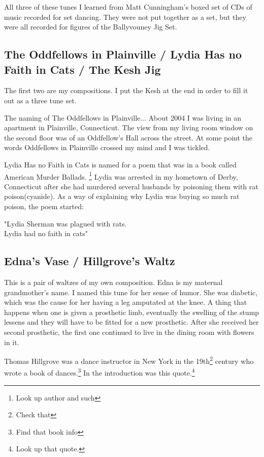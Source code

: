 \documentclass[11pt,letterpaper]{article}
\begin{document}
All three of these tunes I learned from Matt Cunningham's boxed set of CDs of music recorded for set dancing. They were not put together as a set, but they were all recorded for figures of the Ballyvouney Jig Set. 

\subsection*{The Oddfellows in Plainville / Lydia Has no Faith in Cats / The Kesh Jig}

The first two are my compositions. I put the Kesh at the end in order to fill it out as a three tune set.

The naming of The Oddfellows in Plainville... About 2004 I was living in an apartment in Plainville, Connecticut. The view from my living room window on the second floor was of an Oddfellow's Hall across the street. At some point the words Oddfellows in Plainville crossed my mind and I was tickled. 

Lydia Has no Faith in Cats is named for a poem that was in a book called American Murder Ballads. \footnote{Look up author and such} Lydia was arrested in my hometown of Derby, Connecticut after she had murdered several husbands by poisoning them with rat poison(cyanide). As a way of explaining why Lydia was buying so much rat poison, the poem started:
\begin{center}
    "Lydia Sherman was plagued with rats.\\
    Lydia had no faith in cats" \\
\end{center}

\subsection*{Edna's Vase / Hillgrove's Waltz}

This is a pair of waltzes of my own composition. Edna is my maternal grandmother's name. I named this tune for her sense of humor. She was diabetic, which was the cause for her having a leg amputated at the knee. A thing that happens when one is given a prosthetic limb, eventually the swelling of the stump lessens and they will have to be fitted for a new prosthetic. After she received her second prosthetic, the first one continued to live in the dining room with flowers in it. 

Thomas Hillgrove was a dance instructor in New York in the 19th\footnote{Check that} century who wrote a book of dances.\footnote{Find that book info} In the introduction was this quote.\footnote{Look up that quote.}
\end{document}
